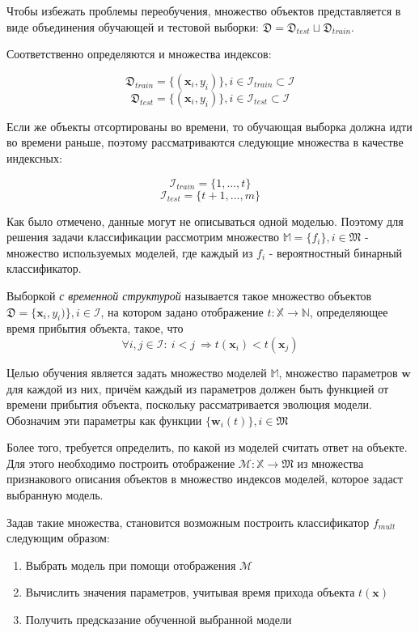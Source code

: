 \documentclass[12pt,twoside]{article}
\begin{document}
Чтобы избежать проблемы переобучения, множество объектов представляется в виде объединения обучающей и тестовой выборки: $\mathfrak{D} = \mathfrak{D}_{test} \sqcup \mathfrak{D}_{train}$.

Соответственно определяются и множества индексов:

$$ \mathfrak{D}_{train} = \{(\mathbf{x}_i, y_i)\}, i \in \mathcal{I}_{train} \subset \mathcal{I} $$
$$ \mathfrak{D}_{test} = \{(\mathbf{x}_i, y_i)\}, i \in \mathcal{I}_{test} \subset \mathcal{I} $$

Если же объекты отсортированы во времени, то обучающая выборка должна идти во времени раньше, поэтому рассматриваются следующие множества в качестве индексных:

$$ \mathcal{I}_{train} = \{1, ..., t\} $$
$$ \mathcal{I}_{test} = \{t + 1, ..., m\} $$

Как было отмечено, данные могут не описываться одной моделью. Поэтому для решения задачи классификации рассмотрим множество $\mathbb{M} = \{f_i\}, i \in \mathfrak{M}$ - множество используемых моделей, где каждый из $f_i$ - вероятностный бинарный классификатор.

\begin{Def}
	Выборкой \emph{с временной структурой} называется такое множество объектов $\mathfrak{D} = \{\mathbf{x}_i, y_i)\}, i \in \mathcal{I}$, на котором задано отображение $t: \mathbb{X} \rightarrow \mathbb{N}$, определяющее время прибытия объекта, такое, что
	$$ \forall i, j \in \mathcal{I}:\ i < j\ \Rightarrow t(\mathbf{x}_i) < t(\mathbf{x}_j) $$
\end{Def}

Целью обучения является задать множество моделей $\mathbb{M}$, множество параметров $\mathbf{w}$ для каждой из них, причём каждый из параметров должен быть функцией от времени прибытия объекта, поскольку рассматривается эволюция модели. Обозначим эти параметры как функции  $\{\mathbf{w}_i(t)\}, i \in \mathfrak{M}$

Более того, требуется определить, по какой из моделей считать ответ на объекте. Для этого необходимо построить отображение $\mathcal{M}: \mathbb{X} \rightarrow \mathfrak{M}$ из множества признакового описания объектов в множество индексов моделей, которое задаст выбранную модель.

Задав такие множества, становится возможным построить классификатор $f_{mult}$ следующим образом:

\begin{enumerate}
	\item Выбрать модель при помощи отображения $\mathcal{M}$
	\item Вычислить значения параметров, учитывая время прихода объекта $t(\mathbf{x})$
	\item Получить предсказание обученной выбранной модели
\end{enumerate}
\end{document}
